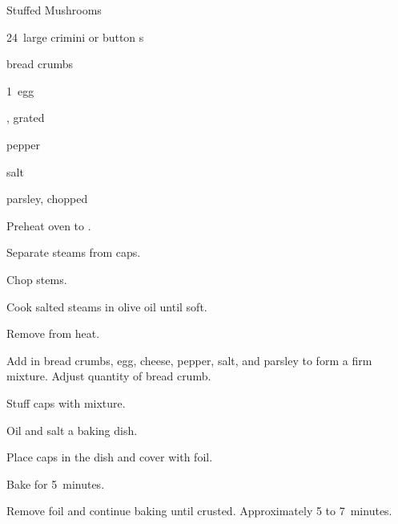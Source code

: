 \begin{recipe}{Stuffed Mushrooms}{}{}

\begin{ingredients}
\item 24~large crimini or button s
\item bread crumbs
\item 1~egg
\item {} , grated
\item pepper
\item salt
\item {} parsley, chopped
\end{ingredients}

\begin{directions}
\item Preheat oven to .
\item Separate steams from caps.
\item Chop stems.
\item Cook salted steams in olive oil until soft.
\item Remove from heat.
\item Add in bread crumbs, egg, cheese, pepper, salt, and parsley to form a firm mixture. Adjust quantity of bread crumb.
\item Stuff caps with mixture.
\item Oil and salt a baking dish.
\item Place caps in the dish and cover with foil.
\item Bake for 5~minutes.
\item Remove foil and continue baking until crusted. Approximately 5 to 7~minutes.
\end{directions}

\end{recipe}
